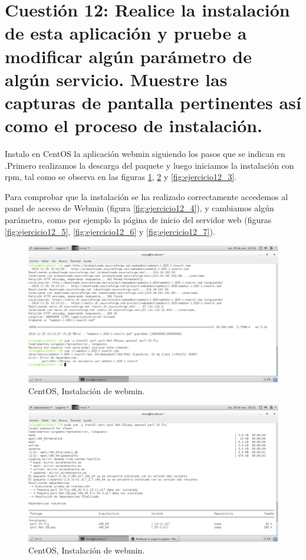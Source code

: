 
\section{Cuestión 12: Realice la instalación de esta aplicación y pruebe a modificar algún parámetro de algún servicio. Muestre las capturas de pantalla pertinentes así como el proceso de instalación.}

Instalo en CentOS la aplicación webmin siguiendo los pasos que se indican en \cite{webmin}.Primero realizamos la descarga del paquete y luego iniciamos la instalación con rpm, tal como se observa en las figuras \ref{fig:ejercicio12_1}, \ref{fig:ejercicio12_2} y \ref{fig:ejercicio12_3}.

Para comprobar que la instalación se ha realizado correctamente accedemos al panel de acceso de Webmin (figura  \ref{fig:ejercicio12_4}), y cambiamos algún parámetro, como por ejemplo la página de inicio del servidor web (figuras \ref{fig:ejercicio12_5}, \ref{fig:ejercicio12_6} y \ref{fig:ejercicio12_7}).


\begin{figure}[H] 
	\centering
	\includegraphics[width=15cm]{./img/ejercicio12_1.png} 	
	\caption{CentOS, Instalación de webmin.} \label{fig:ejercicio12_1}
\end{figure}

\begin{figure}[H] 
	\centering
	\includegraphics[width=15cm]{./img/ejercicio12_2.png} 	
	\caption{CentOS, Instalación de webmin.} \label{fig:ejercicio12_2}
\end{figure}


